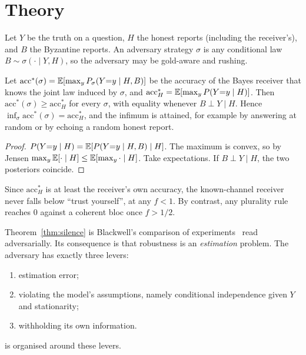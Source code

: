 \section{Theory}\label{sec:theory}

Let $Y$ be the truth on a question, $H$ the honest reports (including the receiver's), and $B$ the Byzantine reports. An adversary strategy $\sigma$ is any conditional law $B\sim\sigma(\cdot\mid Y,H)$, so the adversary may be gold-aware and rushing.

\begin{theorem}\label{thm:silence}
Let $\mathrm{acc}^*(\sigma)=\mathbb{E}[\max_y P_\sigma(Y{=}y\mid H,B)]$ be the accuracy of the Bayes receiver that knows the joint law induced by $\sigma$, and $\mathrm{acc}^*_H=\mathbb{E}[\max_y P(Y{=}y\mid H)]$. Then $\mathrm{acc}^*(\sigma)\ge\mathrm{acc}^*_H$ for every $\sigma$, with equality whenever $B\perp Y\mid H$. Hence $\inf_\sigma\mathrm{acc}^*(\sigma)=\mathrm{acc}^*_H$, and the infimum is attained, for example by answering at random or by echoing a random honest report.
\end{theorem}
\begin{proof}
$P(Y{=}y\mid H)=\mathbb{E}[P(Y{=}y\mid H,B)\mid H]$. The maximum is convex, so by Jensen $\max_y\mathbb{E}[\cdot\mid H]\le\mathbb{E}[\max_y\cdot\mid H]$. Take expectations. If $B\perp Y\mid H$, the two posteriors coincide.
\end{proof}

\begin{corollary}
Since $\mathrm{acc}^*_H$ is at least the receiver's own accuracy, the known-channel receiver never falls below ``trust yourself'', at any $f<1$. By contrast, any plurality rule reaches $0$ against a coherent bloc once $f>1/2$.
\end{corollary}
Theorem~\ref{thm:silence} is Blackwell's comparison of experiments~\citep{blackwell1953} read adversarially. Its consequence is that robustness is an \emph{estimation} problem. The adversary has exactly three levers:
\begin{enumerate}
\item estimation error;
\item violating the model's assumptions, namely conditional independence given $Y$ and stationarity;
\item withholding its own information.
\end{enumerate}
 is organised around these levers.

